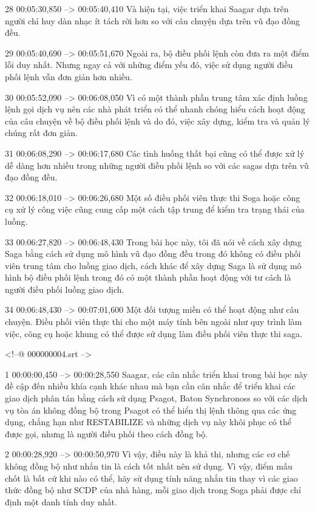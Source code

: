 28
00:05:30,850 --> 00:05:40,410
Và hiện tại, việc triển khai Saagar dựa trên người chỉ huy dàn nhạc ít tách rời hơn so với câu chuyện dựa trên vũ đạo đồng đều.

29
00:05:40,690 --> 00:05:51,670
Ngoài ra, bộ điều phối lệnh còn đưa ra một điểm lỗi duy nhất.  Nhưng ngay cả với những điểm yếu đó, việc sử dụng người điều phối lệnh vẫn đơn giản hơn nhiều.

30
00:05:52,090 --> 00:06:08,050
Vì có một thành phần trung tâm xác định luồng lệnh gọi dịch vụ nên các nhà phát triển có thể nhanh chóng hiểu cách hoạt động của câu chuyện về bộ điều phối lệnh và do đó, việc xây dựng, kiểm tra và quản lý chúng rất đơn giản.

31
00:06:08,290 --> 00:06:17,680
Các tình huống thất bại cũng có thể được xử lý dễ dàng hơn nhiều trong những người điều phối lệnh so với các sagas dựa trên vũ đạo đồng đều.

32
00:06:18,010 --> 00:06:26,680
Một số điều phối viên thực thi Soga hoặc công cụ xử lý công việc cũng cung cấp một cách tập trung để kiểm tra trạng thái của luồng.

33
00:06:27,820 --> 00:06:48,430
Trong bài học này, tôi đã nói về cách xây dựng Saga bằng cách sử dụng mô hình vũ đạo đồng đều trong đó không có điều phối viên trung tâm cho luồng giao dịch, cách khác để xây dựng Saga là sử dụng mô hình bộ điều phối lệnh trong đó có một thành phần hoạt động  với tư cách là người điều phối luồng giao dịch.

34
00:06:48,430 --> 00:07:01,600
Một đối tượng miền có thể hoạt động như câu chuyện.  Điều phối viên thực thi cho một máy tính bên ngoài như quy trình làm việc, công cụ hoặc khung có thể được sử dụng làm điều phối viên thực thi saga.

<!--@ 000000004.srt -->

1
00:00:00,450 --> 00:00:28,550
Saagar, các cân nhắc triển khai trong bài học này đề cập đến nhiều khía cạnh khác nhau mà bạn cần cân nhắc để triển khai các giao dịch phân tán bằng cách sử dụng Psagot, Baton Synchronoss so với các dịch vụ tòa án không đồng bộ trong Psagot có thể hiển thị lệnh thông qua các ứng dụng, chẳng hạn như RESTABILIZE và những dịch vụ này khôi phục  có thể được gọi, nhưng là người điều phối theo cách đồng bộ.

2
00:00:28,920 --> 00:00:50,970
Vì vậy, điều này là khả thi, nhưng các cơ chế không đồng bộ như nhắn tin là cách tốt nhất nên sử dụng.  Vì vậy, điểm mấu chốt là bất cứ khi nào có thể, hãy sử dụng tính năng nhắn tin thay vì các giao thức đồng bộ như SCDP của nhà hàng, mỗi giao dịch trong Soga phải được chỉ định một danh tính duy nhất.

